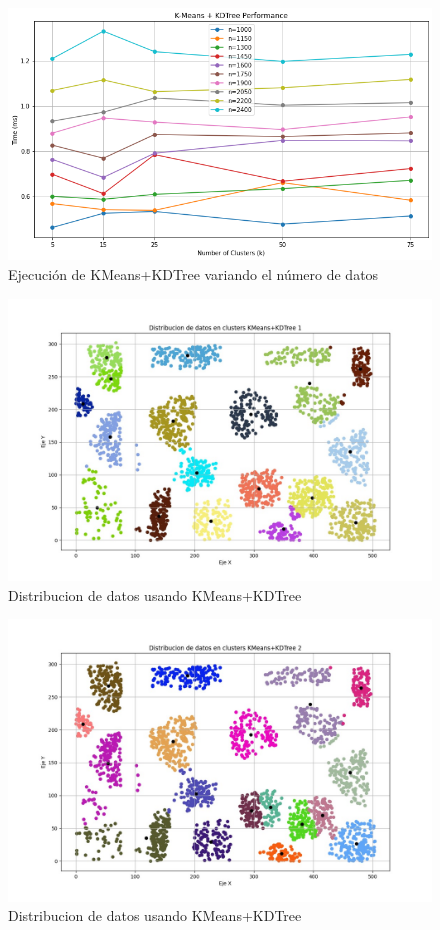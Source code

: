 \documentclass[conference]{IEEEtran}
\begin{document}
\begin{figure}[htbp]
    \centering
    \includegraphics[width=1\linewidth]{figures/kmeanskdtree_six.png} %
    \caption{Ejecución de KMeans+KDTree variando el número de datos}
    \label{fig:kmeanskdtree_six}
\end{figure}
\begin{figure}[htbp]
    \centering
    \includegraphics[width=1\linewidth]{figures/kdtree1.jpeg} %
    \caption{Distribucion de datos usando KMeans+KDTree}
    \label{fig:kdtree1}
\end{figure}
\begin{figure}[htbp]
    \centering
    \includegraphics[width=1\linewidth]{figures/kdtree2.jpeg} %
    \caption{Distribucion de datos usando KMeans+KDTree}
    \label{fig:kdtree2}
\end{figure}
\end{document}
